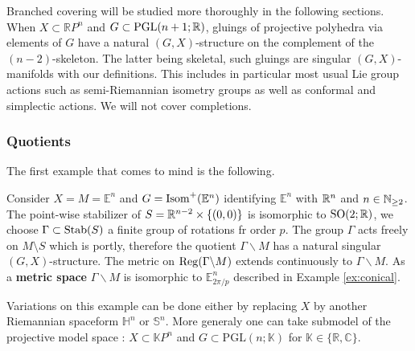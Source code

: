 Branched covering will be studied more thoroughly in the following sections. When $X\subset \mathbb RP^n$ and $G\subset \mathrm{PGL}(n+1; \mathbb R)$, gluings of projective polyhedra via elements of $G$ have a natural $(G,X)$-structure on the complement of the $(n-2)$-skeleton. The latter being skeletal, such gluings are singular $(G,X)$-manifolds with our definitions. This includes in particular most usual Lie group actions such as semi-Riemannian isometry groups as well as conformal and simplectic actions. We will not cover completions.

\subsubsection{Quotients}
The first example that comes to mind is the following.
\begin{ex} 
  Consider $X=M = \mathbb E^n$ and $G=\mathrm{Isom}^+(\mathbb E^n)$ identifying $\mathbb E^n$ with $\mathbb R^n$ and $n\in \mathbb{N}_{\geq 2}$. The point-wise stabilizer of $S = \mathbb R^{n-2}\times \{(0,0)\}$ is isomorphic to $\mathrm {SO}(2;\mathbb R)$,  we choose $\Gamma \subset \mathrm{Stab}(S)$ a finite group of rotations fr order $p$.
 The group $\Gamma$ acts freely on $M\setminus S$ which is portly, therefore the quotient $\Gamma \backslash M$ has a natural singular $(G,X)$-structure. 
 The metric on $\mathrm{Reg}(\Gamma\backslash M)$ extends continuously to $\Gamma\backslash M$. As a \textbf{metric space} $\Gamma \backslash M$ is isomorphic to $\mathbb E^n_ {2\pi/p}$ described in Example \ref{ex:conical}.
 
  Variations on this example can be done either by replacing $X$ by another Riemannian spaceform $\mathbb H^n$ or $\mathbb S^n$. More generaly one can take submodel of the projective model space :
 $X \subset \mathbb K P^n$ and $G \subset \mathrm{PGL}(n;\mathbb K)$ for $\mathbb K \in \{\mathbb R,\mathbb C\}$.
\end{ex}

